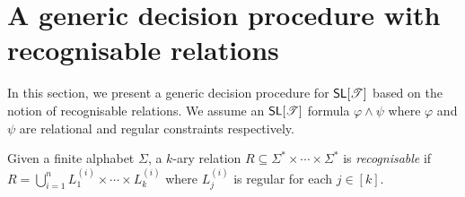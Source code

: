 



\section{A generic decision procedure with recognisable relations} \label{sec:algo}

In this section,  we present a generic decision procedure for $\textsf{SL}[\mathscr{T}]$ based on the notion of recognisable relations. We assume an $\textsf{SL}[\mathscr{T}]$ formula $\varphi \wedge \psi$ where $\varphi$ and $\psi$ are relational and  regular constraints respectively.

\begin{definition}
	Given a finite alphabet $\Sigma$, a $k$-ary relation $R\subseteq \Sigma^*\times \cdots\times \Sigma^*$ is \emph{recognisable}  if $R=\bigcup_{i=1}^n L^{(i)}_1\times \cdots\times L^{(i)}_k$ where $L^{(i)}_j$ is regular for each $j\in [k]$.
%
\end{definition}


